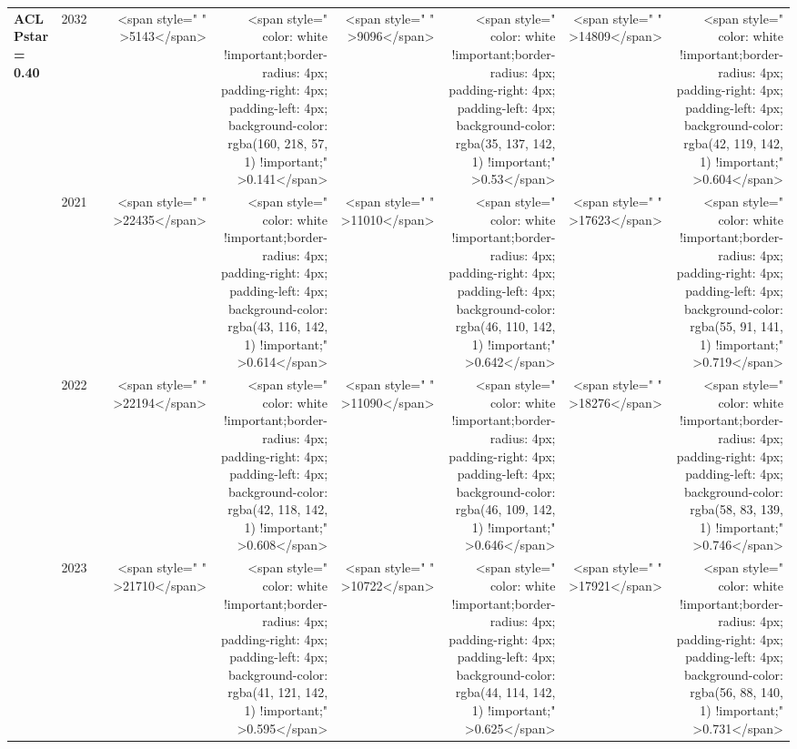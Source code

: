 \begin{table}
\begin{tabular}[t]{>{}l|l>{}rr>{}r|rrrr}
\multirow{-12}{*}{\raggedright\arraybackslash \textbf{ACL Pstar = 0.40}} & 2032 & \cellcolor[HTML]{797977}{\textcolor{white}{2905}} & <span style="     " >5143</span> & <span style="     color: white !important;border-radius: 4px; padding-right: 4px; padding-left: 4px; background-color: rgba(160, 218, 57, 1) !important;" >0.141</span> & <span style="     " >9096</span> & <span style="     color: white !important;border-radius: 4px; padding-right: 4px; padding-left: 4px; background-color: rgba(35, 137, 142, 1) !important;" >0.53</span> & <span style="     " >14809</span> & <span style="     color: white !important;border-radius: 4px; padding-right: 4px; padding-left: 4px; background-color: rgba(42, 119, 142, 1) !important;" >0.604</span>\\
\cmidrule{1-9}
 & 2021 & \cellcolor[HTML]{B0A473}{\textcolor{white}{1200}} & <span style="     " >22435</span> & <span style="     color: white !important;border-radius: 4px; padding-right: 4px; padding-left: 4px; background-color: rgba(43, 116, 142, 1) !important;" >0.614</span> & <span style="     " >11010</span> & <span style="     color: white !important;border-radius: 4px; padding-right: 4px; padding-left: 4px; background-color: rgba(46, 110, 142, 1) !important;" >0.642</span> & <span style="     " >17623</span> & <span style="     color: white !important;border-radius: 4px; padding-right: 4px; padding-left: 4px; background-color: rgba(55, 91, 141, 1) !important;" >0.719</span>\\

 & 2022 & \cellcolor[HTML]{B0A473}{\textcolor{white}{1200}} & <span style="     " >22194</span> & <span style="     color: white !important;border-radius: 4px; padding-right: 4px; padding-left: 4px; background-color: rgba(42, 118, 142, 1) !important;" >0.608</span> & <span style="     " >11090</span> & <span style="     color: white !important;border-radius: 4px; padding-right: 4px; padding-left: 4px; background-color: rgba(46, 109, 142, 1) !important;" >0.646</span> & <span style="     " >18276</span> & <span style="     color: white !important;border-radius: 4px; padding-right: 4px; padding-left: 4px; background-color: rgba(58, 83, 139, 1) !important;" >0.746</span>\\

 & 2023 & \cellcolor[HTML]{4E576C}{\textcolor{white}{4378}} & <span style="     " >21710</span> & <span style="     color: white !important;border-radius: 4px; padding-right: 4px; padding-left: 4px; background-color: rgba(41, 121, 142, 1) !important;" >0.595</span> & <span style="     " >10722</span> & <span style="     color: white !important;border-radius: 4px; padding-right: 4px; padding-left: 4px; background-color: rgba(44, 114, 142, 1) !important;" >0.625</span> & <span style="     " >17921</span> & <span style="     color: white !important;border-radius: 4px; padding-right: 4px; padding-left: 4px; background-color: rgba(56, 88, 140, 1) !important;" >0.731</span>\\


\end{tabular}
\end{table}
